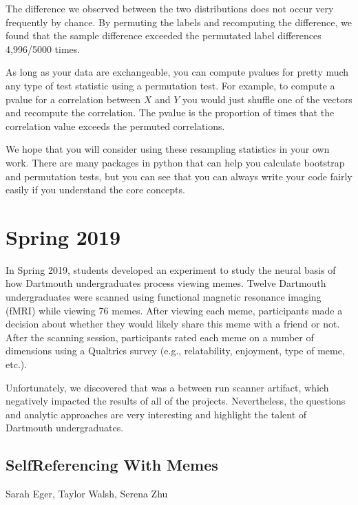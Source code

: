 \documentclass[letterpaper,10pt,english]{sphinxmanual}
\begin{document}
\noindent{}

The difference we observed between the two distributions does not occur very frequently by chance. By permuting the labels and recomputing the difference, we found that the sample difference exceeded the permutated label differences 4,996/5000 times.

As long as your data are exchangeable, you can compute p\sphinxhyphen{}values for pretty much any type of test statistic using a permutation test. For example, to compute a p\sphinxhyphen{}value for a correlation between \(X\) and \(Y\) you would just shuffle one of the vectors and recompute the correlation. The p\sphinxhyphen{}value is the proportion of times that the correlation value exceeds the permuted correlations.

We hope that you will consider using these resampling statistics in your own work. There are many packages in python that can help you calculate bootstrap and permutation tests, but you can see that you can always write your code fairly easily if you understand the core concepts.


\section{Spring 2019}
\label{\detokenize{content/2019_Spring:spring-2019}}\label{\detokenize{content/2019_Spring::doc}}
In Spring 2019, students developed an experiment to study the neural basis of how Dartmouth undergraduates process viewing memes. Twelve Dartmouth undergraduates were scanned using functional magnetic resonance imaging (fMRI) while viewing 76 memes. After viewing each meme, participants made a decision about whether they would likely share this meme with a friend or not. After the scanning session, participants rated each meme on a number of dimensions using a Qualtrics survey (e.g., relatability, enjoyment, type of meme, etc.).

Unfortunately, we discovered that was a between run scanner artifact, which negatively impacted the results of all of the projects. Nevertheless, the questions and analytic approaches are very interesting and highlight the talent of Dartmouth undergraduates.


\subsection{Self\sphinxhyphen{}Referencing With Memes}
\label{\detokenize{content/2019_Spring:self-referencing-with-memes}}
Sarah Eger, Taylor Walsh, Serena Zhu
\end{document}
